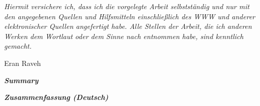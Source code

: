 
\mbox{}
\newpage
\begin{multicols}{2}
    \vspace*{\textheight}
    \columnbreak
    \vspace*{3cm}
	    \Large{\textit{Hiermit versichere ich, dass ich die vorgelegte Arbeit selbstst{\"a}ndig und nur mit den angegebenen Quellen und Hilfsmitteln einschließlich des WWW und anderer elektronischer Quellen angefertigt habe.
        Alle Stellen der Arbeit, die ich anderen Werken dem Wortlaut oder dem Sinne nach entnommen habe, sind kenntlich gemacht.}}
    \vspace{0.55cm}
    \begin{flushright}
		{Eran Raveh}
    \end{flushright}
\end{multicols}
\clearpage

\pagestyle{fancyplain}
\fancyhead{} %
\renewcommand{\headrulewidth}{0pt} %
\cfoot{} %
\fancyfoot[LO,RE]{\thepage} %
\setcounter{page}{1}

\begin{center}
	\textit{\textbf{\Huge Summary}}\\[1cm]
\end{center}

\clearpage

\begin{center}
	\textit{\textbf{\Huge Zusammenfassung (Deutsch)}}\\[1cm]
\end{center}
	
\cleardoublepage

\renewcommand{\contentsname}{\hfill\bfseries\Huge Table of Contents\hfill}
\renewcommand{\cftaftertoctitle}{\hfill}
\setlength\cftaftertoctitleskip{60pt} %
{
    {\large{} \tableofcontents \normalsize{}}}

